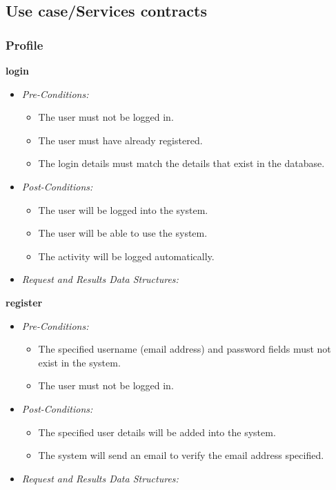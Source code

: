 \documentclass[a4paper,12pt]{article}
\begin{document}

\subsection{Use case/Services contracts}
\subsubsection{Profile}
\textbf{{login}}
	\begin{itemize}
		\item \textit{Pre-Conditions:}
			\begin{itemize}
				\item The user must not be logged in.
				\item The user must have already registered.
				\item The login details must match the details that exist in the database.
			\end{itemize}
		\item \textit{Post-Conditions:}
			\begin{itemize}
				\item The user will be logged into the system.
				\item The user will be able to use the system.
				\item The activity will be logged automatically.
			\end{itemize}
		\item \textit{Request and Results Data Structures:}
	\end{itemize}
\textbf{{register}}
	\begin{itemize}
		\item \textit{Pre-Conditions:}
			\begin{itemize}
				\item The specified username (email address) and password fields must not exist in the system.
				\item The user must not be logged in.
			\end{itemize}
		\item \textit{Post-Conditions:}
			\begin{itemize}
				\item The specified user details will be added into the system.
				\item The system will send an email to verify the email address specified.
			\end{itemize}
		\item \textit{Request and Results Data Structures:}
	\end{itemize}
\end{document}
